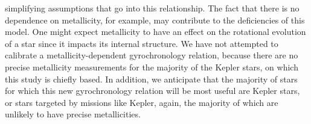 \documentclass[useAMS, usenatbib]{mn2e}
\begin{document}
simplifying assumptions that go into this relationship.
The fact that there is no dependence on metallicity, for example, may
contribute to the deficiencies of this model.
One might expect metallicity to have an effect on the rotational evolution of
a star since it impacts its internal structure.
We have not attempted to calibrate a metallicity-dependent gyrochronology
relation, because there are no precise metallicity measurements for the
majority of the Kepler stars, on which this study is chiefly based.
In addition, we anticipate that the majority of stars for which this new
gyrochronology relation will be most useful are Kepler stars, or stars
targeted by missions like Kepler, again, the majority of which are unlikely to
have precise metallicities.  %

\begin{figure}
\begin{center}
\end{center}
\end{figure}
\end{document}
